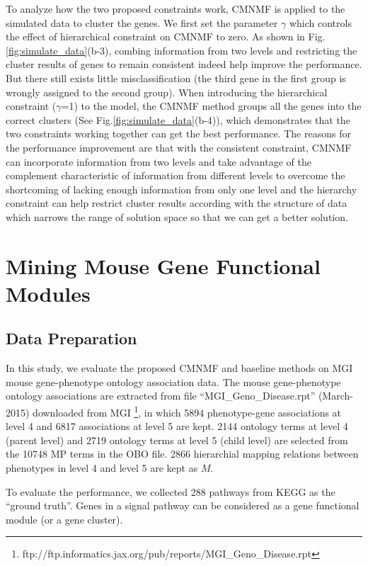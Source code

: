 \documentclass{bmcart}
\begin{document}
To analyze how the two proposed constraints work, CMNMF is applied to the simulated data to cluster the genes. We first set the parameter $\gamma$ which controls the effect of hierarchical constraint on CMNMF to zero. As shown in Fig.\ref{fig:simulate_data}(b-3), combing information from two levels and restricting the cluster results of genes to remain consistent indeed help improve the performance. But there still exists little misclassification (the third gene in the first group is wrongly assigned to the second group). When introducing the hierarchical constraint ($\gamma$=1) to the model, the CMNMF method groups all the genes into the correct clusters (See Fig.\ref{fig:simulate_data}(b-4)), which demonstrates that the two constraints working together can get the best performance. The reasons for the performance improvement are that with the consistent constraint, CMNMF can incorporate information from two levels and take advantage of the complement characteristic of information from different levels to overcome the shortcoming of lacking enough information from only one level and the hierarchy constraint can help restrict cluster results according with the structure of data which narrows the range of solution space so that we can get a better solution.


\section*{Mining Mouse Gene Functional Modules}
\subsection*{Data Preparation}
In this study, we evaluate the proposed CMNMF and baseline methods on MGI mouse gene-phenotype ontology association data. The mouse gene-phenotype ontology associations are extracted from file ``MGI\_Geno\_Disease.rpt'' (March-2015) downloaded from MGI \footnote[1]{ftp://ftp.informatics.jax.org/pub/reports/MGI\_Geno\_Disease.rpt}, in which 5894 phenotype-gene associations at level 4 and 6817 associations at level 5 are kept. 2144 ontology terms at level 4 (parent level) and 2719 ontology terms at level 5 (child level)  are selected from the 10748 MP terms in the OBO file. 2866 hierarchial mapping relations between phenotypes in level 4 and level 5 are kept as $M$.

To evaluate the performance, we collected 288 pathways from KEGG as the ``ground truth''. Genes in a signal pathway can be considered as a gene functional module (or a gene cluster).
\end{document}
